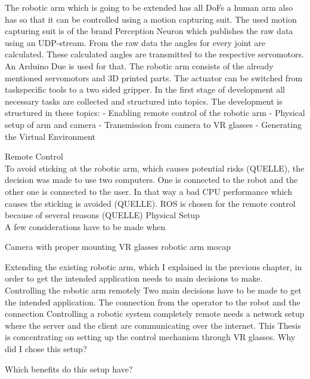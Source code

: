 The robotic arm which is going to be extended has all DoFs a human arm also has so that it can be controlled using a motion capturing suit. The used motion capturing suit is of the brand Perception Neuron which publishes the raw data using an UDP-stream. From the raw data the angles for every joint are calculated. These calculated angles are transmitted to the respective servomotors. An Arduino Due is used for that. The robotic arm consists of the already mentioned servomotors and 3D printed parts. The actuator can be switched from taskspecific tools to a two sided gripper. 
In the first stage of development all necessary tasks are collected and structured into topics. The development is structured in these topics:
- Enabling remote control of the robotic arm
- Physical setup of arm and camera
- Transmission from camera to VR glasses
- Generating the Virtual Environment

Remote Control\\
To avoid sticking at the robotic arm, which causes potential risks (QUELLE), the decision was made to use two computers. One is connected to the robot and the other one is connected to the user. In that way a bad CPU performance which causes the sticking is avoided (QUELLE). ROS is chosen for the remote control because of several reasons (QUELLE)
Physical Setup\\
A few considerations have to be made when 

Camera with proper mounting
VR glasses
robotic arm
mocap

Extending the existing robotic arm, which I explained in the previous chapter, in order to get the intended application needs to main decisions to make. Controlling the robotic arm remotely
Two main decisions have to be made to get the intended application. The connection from the operator to the robot and the connection
Controlling a robotic system completely remote needs a network setup where the server and the client are communicating over the internet. This Thesis is concentrating on setting up the control mechanism through VR glasses.
 Why did I chose this setup?
 
 Which benefits do this setup have?
 

